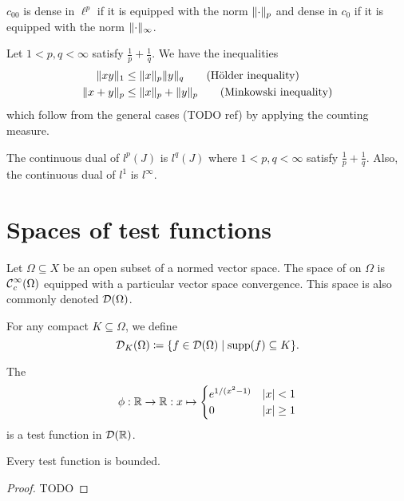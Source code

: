 \begin{lemma}
$c_{00}$ is dense in $\ell^p$ if it is equipped with the norm $\lVert\cdot\rVert_p$ and dense in $c_0$ if it is equipped with the norm $\lVert\cdot\rVert_\infty$.
\end{lemma}

Let $1<p,q<\infty$ satisfy $\frac{1}{p}+\frac{1}{q}$. We have the inequalities
\begin{align*}
\lVert xy\rVert_1 &\leq \lVert x\rVert_p\lVert y\rVert_q\qquad\text{(Hölder inequality)} \\
\lVert x+y\rVert_p &\leq \lVert x\rVert_p+\lVert y\rVert_p\qquad\text{(Minkowski inequality)}
\end{align*}
which follow from the general cases (TODO ref) by applying the counting measure.

\begin{proposition}
The continuous dual of $l^p(J)$ is $l^q(J)$ where $1<p,q<\infty$ satisfy $\frac{1}{p}+\frac{1}{q}$.
Also, the continuous dual of $l^1$ is $l^\infty$.
\end{proposition}


\section{Spaces of test functions}
\begin{definition}
Let $\Omega\subseteq X$ be an open subset of a normed vector space. The space of  on $\Omega$ is $\operatorname{\mathcal{C}}^\infty_c(\Omega)$ equipped with a particular vector space convergence. This space is also commonly denoted $\operatorname{\mathcal{D}}(\Omega)$.

For any compact $K\subseteq \Omega$, we define
\[ \testFuncs_K(\Omega) \defeq \setbuilder{f\in \testFuncs(\Omega)}{\supp(f) \subseteq K}. \]
\end{definition}

\begin{example}
The 
\[ \phi: \mathbb{R}\to\mathbb{R}: x\mapsto \begin{cases}
e^{1/(x^2-1)} & |x|<1 \\ 0 & |x| \geq 1
\end{cases} \]
is a test function in $\operatorname{\mathcal{D}}(\mathbb{R})$.
\end{example}

\begin{lemma}
Every test function is bounded.
\end{lemma}
\begin{proof}
TODO
\end{proof}

